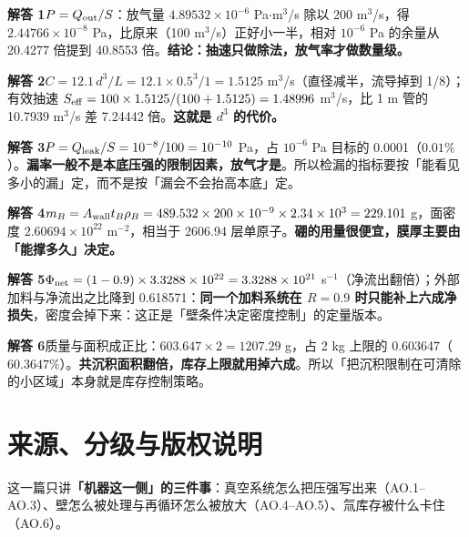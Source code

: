 \textbf{解答 1}$P=Q_{\rm out}/S$：放气量 $4.89532\times10^{-6}$ Pa$\cdot$m$^3$/s 除以 200 m$^3$/s，得 $2.44766\times10^{-8}$ Pa，比原来（100 m$^3$/s）正好小一半，相对 $10^{-6}$ Pa 的余量从 20.4277 倍提到 40.8553 倍。\textbf{结论：抽速只做除法，放气率才做数量级。}

\textbf{解答 2}$C=12.1\,d^3/L=12.1\times0.5^3/1=1.5125$ m$^3$/s（直径减半，流导掉到 1/8）；有效抽速 $S_{\rm eff}=100\times1.5125/(100+1.5125)=1.48996$ m$^3$/s，比 1 m 管的 10.7939 m$^3$/s 差 7.24442 倍。\textbf{这就是 $d^3$ 的代价。}

\textbf{解答 3}$P=Q_{\rm leak}/S=10^{-8}/100=10^{-10}$ Pa，占 $10^{-6}$ Pa 目标的 0.0001（$0.01\%$）。\textbf{漏率一般不是本底压强的限制因素，放气才是}。所以检漏的指标要按「能看见多小的漏」定，而不是按「漏会不会抬高本底」定。

\textbf{解答 4}$m_B=A_{\rm wall}t_B\rho_B=489.532\times200\times10^{-9}\times2.34\times10^{3}=229.101$ g，面密度 $2.60694\times10^{22}$ m$^{-2}$，相当于 2606.94 层单原子。\textbf{硼的用量很便宜，膜厚主要由「能撑多久」决定。}

\textbf{解答 5}$\Phi_{\rm net}=(1-0.9)\times3.3288\times10^{22}=3.3288\times10^{21}$ s$^{-1}$（净流出翻倍）；外部加料与净流出之比降到 0.618571：\textbf{同一个加料系统在 $R=0.9$ 时只能补上六成净损失}，密度会掉下来：这正是「壁条件决定密度控制」的定量版本。

\textbf{解答 6}质量与面积成正比：$603.647\times2=1207.29$ g，占 2 kg 上限的 0.603647（$60.3647\%$）。\textbf{共沉积面积翻倍，库存上限就用掉六成}。所以「把沉积限制在可清除的小区域」本身就是库存控制策略。


\section{来源、分级与版权说明}
\label{sec:app-ao-source}

\begingroup\small
这一篇只讲\textbf{「机器这一侧」的三件事}：真空系统怎么把压强写出来（AO.1--AO.3）、壁怎么被处理与再循环怎么被放大（AO.4--AO.5）、氚库存被什么卡住（AO.6）。

